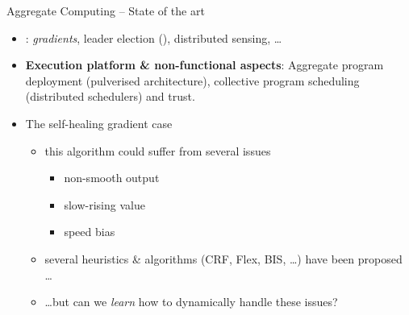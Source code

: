 \documentclass[8pt, aspectratio=169, handout]{beamer}
\begin{document}
\begin{frame}{Aggregate Computing -- State of the art}
\begin{card}
  \begin{itemize}
    \item {}: \emph{gradients}, leader election (), distributed sensing, \dots
    \item \textbf{Execution platform \& non-functional aspects}: Aggregate program deployment (pulverised architecture), collective program scheduling (distributed schedulers) and trust.
  \end{itemize}
\end{card}
\begin{alarm}[Challenges]
  \begin{itemize}
    \item The self-healing gradient case
    \begin{itemize}
      \item this algorithm could suffer from several issues~\cite{DBLP:conf/saso/AudritoCDV17}
      \begin{itemize}
        \item[\faArrowRight] non-smooth output
        \item[\faArrowRight] slow-rising value
        \item[\faArrowRight] speed bias
      \end{itemize}
      \item several heuristics \& algorithms (CRF, Flex, BIS, \dots) have been proposed \dots
      \item \dots but can we \emph{learn} how to dynamically handle these issues?
    \end{itemize}
  \end{itemize}
\end{alarm}
\end{frame}
\end{document}
